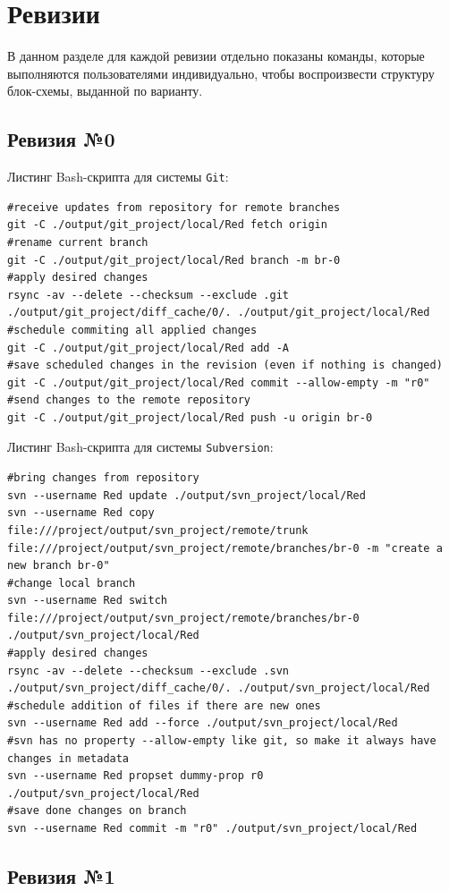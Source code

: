 \section{Ревизии}

В данном разделе для каждой ревизии отдельно показаны команды, которые выполняются пользователями индивидуально, чтобы воспроизвести структуру блок-схемы, выданной по варианту.

\subsection{Ревизия №0}

Листинг Bash-скрипта для системы \texttt{Git}:
\begin{lstlisting}
#receive updates from repository for remote branches
git -C ./output/git_project/local/Red fetch origin
#rename current branch
git -C ./output/git_project/local/Red branch -m br-0
#apply desired changes
rsync -av --delete --checksum --exclude .git ./output/git_project/diff_cache/0/. ./output/git_project/local/Red
#schedule commiting all applied changes
git -C ./output/git_project/local/Red add -A
#save scheduled changes in the revision (even if nothing is changed)
git -C ./output/git_project/local/Red commit --allow-empty -m "r0"
#send changes to the remote repository
git -C ./output/git_project/local/Red push -u origin br-0
\end{lstlisting}

Листинг Bash-скрипта для системы \texttt{Subversion}:
\begin{lstlisting}
#bring changes from repository
svn --username Red update ./output/svn_project/local/Red
svn --username Red copy file:///project/output/svn_project/remote/trunk file:///project/output/svn_project/remote/branches/br-0 -m "create a new branch br-0"
#change local branch
svn --username Red switch file:///project/output/svn_project/remote/branches/br-0 ./output/svn_project/local/Red
#apply desired changes
rsync -av --delete --checksum --exclude .svn ./output/svn_project/diff_cache/0/. ./output/svn_project/local/Red
#schedule addition of files if there are new ones
svn --username Red add --force ./output/svn_project/local/Red
#svn has no property --allow-empty like git, so make it always have changes in metadata
svn --username Red propset dummy-prop r0 ./output/svn_project/local/Red
#save done changes on branch
svn --username Red commit -m "r0" ./output/svn_project/local/Red
\end{lstlisting}


\subsection{Ревизия №1}


